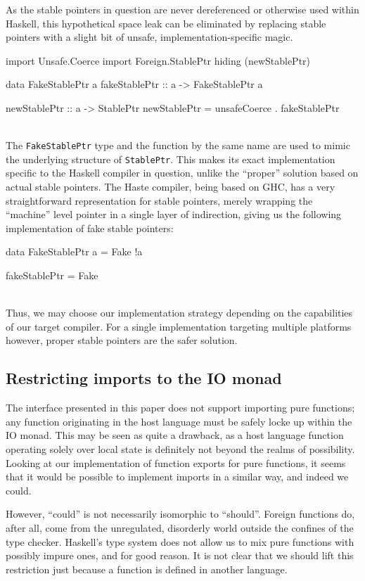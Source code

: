 \documentclass{sigplanconf}
\begin{document}
As the stable pointers in question are never dereferenced or otherwise
used within Haskell, this hypothetical space leak can be eliminated by
replacing stable pointers with a slight bit of unsafe, implementation-specific
magic.\\
\begin{code}
  import Unsafe.Coerce
  import Foreign.StablePtr hiding (newStablePtr)

  data FakeStablePtr a
  fakeStablePtr :: a -> FakeStablePtr a

  newStablePtr :: a -> StablePtr
  newStablePtr = unsafeCoerce . fakeStablePtr
\end{code}\\
The \lstinline!FakeStablePtr! type and the function by the same name are used
to mimic the underlying structure of \lstinline!StablePtr!. This makes its
exact implementation specific to the Haskell compiler in question, unlike
the ``proper'' solution based on actual stable pointers. The Haste
compiler, being based on GHC, has a very straightforward representation for
stable pointers, merely wrapping the ``machine'' level pointer in a single
layer of indirection, giving us the following implementation of fake stable
pointers:\\
\begin{code}
  data FakeStablePtr a = Fake !a

  fakeStablePtr = Fake
\end{code}\\
Thus, we may choose our implementation strategy depending on the capabilities
of our target compiler. For a single implementation targeting multiple
platforms however, proper stable pointers are the safer solution.

\subsection{Restricting imports to the IO monad}
The interface presented in this paper does not support importing pure
functions; any function originating in the host language must be safely locke
up within the IO monad. This may be seen as quite a drawback, as a host
language function operating solely over local state is definitely not
beyond the realms of possibility. Looking at our implementation of function
exports for pure functions, it seems that it would be possible to implement
imports in a similar way, and indeed we could.

However, ``could'' is not necessarily isomorphic to ``should''.
Foreign functions do, after all, come from the unregulated, disorderly world
outside the confines of the type checker. Haskell's type system does not
allow us to mix pure functions with possibly impure ones, and for good
reason. It is not clear that we should lift this
restriction just because a function is defined in another language.
\end{document}

